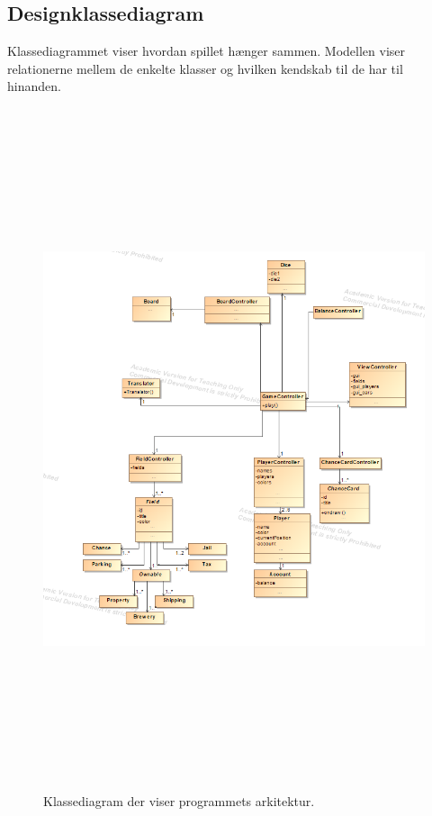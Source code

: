 \subsection{Designklassediagram}
Klassediagrammet viser hvordan spillet hænger sammen. Modellen viser relationerne mellem de enkelte klasser og hvilken kendskab til de har til hinanden. 


\begin{figure}[!h]
    \centering
    \includegraphics[width=\textwidth,height=20cm,keepaspectratio]{sources/6_design/klassediagram.png}
    \caption{Klassediagram der viser programmets arkitektur.}
    \label{fig:KD1}
\end{figure}

